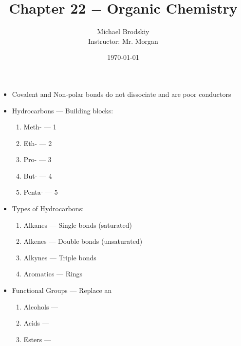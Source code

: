 \documentclass[12pt]{article}
\title{Chapter 22 $-$ Organic Chemistry}
\date{\today}
\author{Michael Brodskiy\\ \small Instructor: Mr. Morgan}
\begin{document}
\maketitle

\begin{itemize}

  \item Covalent and Non-polar bonds do not dissociate and are poor conductors

  \item Hydrocarbons — Building blocks:

    \begin{enumerate}

      \item Meth- — 1

      \item Eth- — 2

      \item Pro- — 3

      \item But- — 4

      \item Penta- — 5

    \end{enumerate}

  \item Types of Hydrocarbons:

    \begin{enumerate}

      \item Alkanes — Single bonds (saturated)

      \item Alkenes — Double bonds (unsaturated)

      \item Alkynes — Triple bonds

      \item Aromatics — Rings

    \end{enumerate}

  \item Functional Groups — Replace an 

    \begin{enumerate}

      \item Alcohols — 

      \item Acids — 

      \item Esters — 


\end{enumerate}
\end{itemize}
\end{document}
